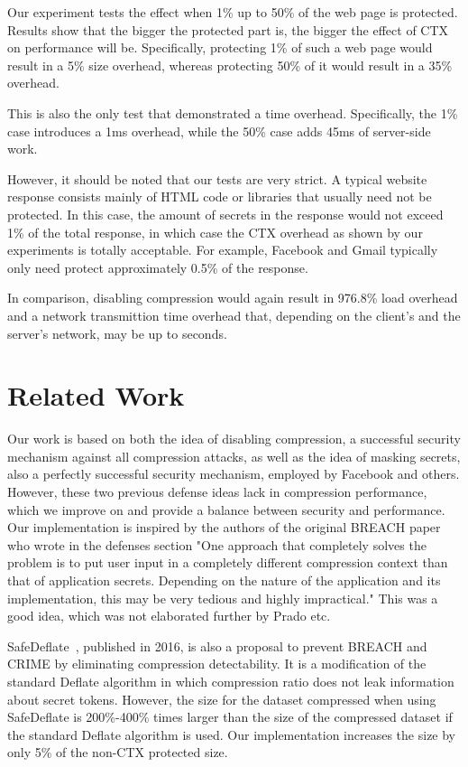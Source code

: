 \documentclass[a4paper, 11 pt, conference]{article}  %
\begin{document}
Our experiment tests the effect when 1\% up to 50\% of the web page is
protected. Results show that the bigger the protected part is, the bigger the effect
of CTX on performance will be. Specifically, protecting 1\% of such a web page
would result in a 5\% size overhead, whereas protecting 50\% of it would result
in a 35\% overhead.

This is also the only test that demonstrated a time overhead. Specifically, the
1\% case introduces a 1ms overhead, while the 50\% case adds 45ms of server-side
work.

However, it should be noted that our tests are very strict. A typical website
response consists mainly of HTML code or libraries that usually need not be
protected. In this case, the amount of secrets in the response would not exceed
1\% of the total response, in which case the CTX overhead as shown by our
experiments is totally acceptable. For example, Facebook and Gmail typically
only need protect approximately 0.5\% of the response.

In comparison, disabling compression would again result in 976.8\% load overhead
and a network transmittion time overhead that, depending on the client's and the
server's network, may be up to seconds.

\section{Related Work}

Our work is based on both the idea of disabling compression, a successful
security mechanism against all compression attacks, as well as the idea of
masking secrets, also a perfectly successful security mechanism, employed by
Facebook and others. However, these two previous defense ideas lack in
compression performance, which we improve on and provide a balance between
security and performance. Our implementation is inspired by the authors of the original BREACH paper who wrote in the defenses section "One approach that completely solves the problem is to put user input in a completely different compression context than that of application secrets. Depending on the nature of the application and its implementation, this may be very tedious and highly impractical." This was a good idea, which was not elaborated further by Prado etc.

SafeDeflate~\cite{c16}, published in 2016, is also a proposal to prevent BREACH
and CRIME by eliminating compression detectability. It is a modification of the
standard Deflate algorithm in which compression ratio does not leak information
about secret tokens. However, the size for the dataset compressed when using
SafeDeflate is 200\%-400\% times larger than the size of the compressed dataset if the
standard Deflate algorithm is used. Our implementation increases the size by only 5\% of the non-CTX protected size.
\end{document}
